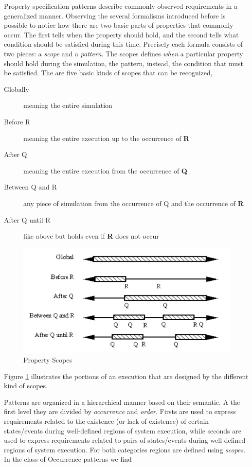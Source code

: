 Property specification patterns \citep{dwyer1998property} describe commonly observed requirements in a generalized manner. Observing the several formalisms introduced before is possible to notice how there are two basic parts of properties that commonly occur. The first tells when the property should hold, and the second tells what condition should be satisfied during this time. Precisely each formula consists of two pieces: a \textit{scope} and a \textit{pattern}. The scopes defines \textit{when} a particular property should hold during the simulation, the pattern, instead, the condition that must be satisfied. The are five basic kinds of scopes that can be recognized,
\begin{description}
\item[Globally] meaning the entire simulation
\item[Before R] meaning the entire execution up to the occurrence of \textbf{R}
\item[After Q] meaning the entire execution from the occurrence of \textbf{Q}
\item[Between Q and R] any piece of simulation from the occurrence of Q and the occurrence of \textbf{R}
\item[After Q until R] like above but holds even if \textbf{R} does not occur
\end{description}
\begin{figure}[!h]
	\centering 
     \includegraphics[width=.7\textwidth]{Figs/scopes.PNG} 
     \caption{Property Scopes} 
     \label{fig:scopes} 
\end{figure} 
Figure \ref{fig:scopes} illustrates the portions of an execution that are designed by the different kind of scopes.
\par Patterns are organized in a hierarchical manner based on their semantic. A the first level they are divided by \textit{occurrence} and \textit{order}. Firsts are used to express requirements related to the existence (or lack of existence) of certain states/events during well-defined regions of system execution, while seconds are used to express requirements related to pairs of states/events during well-defined regions of system execution. For both categories regions are defined using \textit{scopes}. In the class of Occurrence patterns we find
